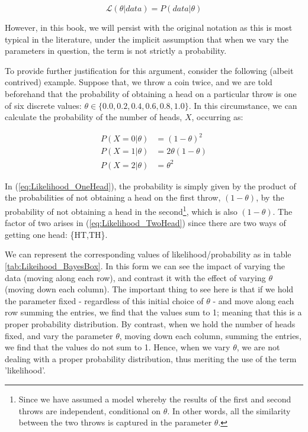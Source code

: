 \documentclass[11pt,fullpage]{book}
\begin{document}
\begin{equation}
\mathcal{L}(\theta|data) = P(data|\theta)
\end{equation}\label{eq:Likelihood_notation}

However, in this book, we will persist with the original notation as this is most typical in the literature, under the implicit assumption that when we vary the parameters in question, the term is not strictly a probability.

To provide further justification for this argument, consider the following (albeit contrived) example. Suppose that, we throw a coin twice, and we are told beforehand that the probability of obtaining a head on a particular throw is one of six discrete values: $\theta\in\{0.0,0.2,0.4,0.6,0.8,1.0\}$. In this circumstance, we can calculate the probability of the number of heads, $X$, occurring as:

\begin{align}\label{eq:Likelihood_OneHead}
P(X = 0|\theta)& = (1-\theta)^2\\
P(X = 1|\theta)& = 2\theta(1-\theta)\\\label{eq:Likelihood_TwoHead}
P(X = 2|\theta)& = \theta^2
\end{align}

In (\ref{eq:Likelihood_OneHead}), the probability is simply given by the product of the probabilities of not obtaining a head on the first throw, $(1-\theta)$, by the probability of not obtaining a head in the second\footnote{Since we have assumed a model whereby the results of the first and second throws are independent, conditional on $\theta$. In other words, all the similarity between the two throws is captured in the parameter $\theta$.}, which is also $(1-\theta)$. The factor of two arises in (\ref{eq:Likelihood_TwoHead}) since there are two ways of getting one head: \{HT,TH\}.

We can represent the corresponding values of likelihood/probability as in table \ref{tab:Likeihood_BayesBox}. In this form we can see the impact of varying the data (moving along each row), and contrast it with the effect of varying $\theta$ (moving down each column). The important thing to see here is that if we hold the parameter fixed - regardless of this initial choice of $\theta$ - and move along each row summing the entries, we find that the values sum to 1; meaning that this is a proper probability distribution. By contrast, when we hold the number of heads fixed, and vary the parameter $\theta$, moving down each column, summing the entries, we find that the values do not sum to 1. Hence, when we vary $\theta$, we are not dealing with a proper probability distribution, thus meriting the use of the term 'likelihood'.
\end{document}
